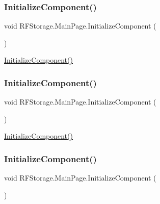 \subsubsection{\texorpdfstring{InitializeComponent()}{InitializeComponent()}\hspace{0.1cm}{\footnotesize\ttfamily [6/8]}}
{\footnotesize\ttfamily void R\+F\+Storage.\+Main\+Page.\+Initialize\+Component (\begin{DoxyParamCaption}{ }\end{DoxyParamCaption})}



\mbox{\hyperlink{class_r_f_storage_1_1_main_page_a44b868cd44ff5ee9dbe953b104a1f9a1}{Initialize\+Component()}} 

\mbox{\label{class_r_f_storage_1_1_main_page_a44b868cd44ff5ee9dbe953b104a1f9a1}} 
\subsubsection{\texorpdfstring{InitializeComponent()}{InitializeComponent()}\hspace{0.1cm}{\footnotesize\ttfamily [7/8]}}
{\footnotesize\ttfamily void R\+F\+Storage.\+Main\+Page.\+Initialize\+Component (\begin{DoxyParamCaption}{ }\end{DoxyParamCaption})}



\mbox{\hyperlink{class_r_f_storage_1_1_main_page_a44b868cd44ff5ee9dbe953b104a1f9a1}{Initialize\+Component()}} 

\mbox{\label{class_r_f_storage_1_1_main_page_a44b868cd44ff5ee9dbe953b104a1f9a1}} 
\subsubsection{\texorpdfstring{InitializeComponent()}{InitializeComponent()}\hspace{0.1cm}{\footnotesize\ttfamily [8/8]}}
{\footnotesize\ttfamily void R\+F\+Storage.\+Main\+Page.\+Initialize\+Component (\begin{DoxyParamCaption}{ }\end{DoxyParamCaption})}



